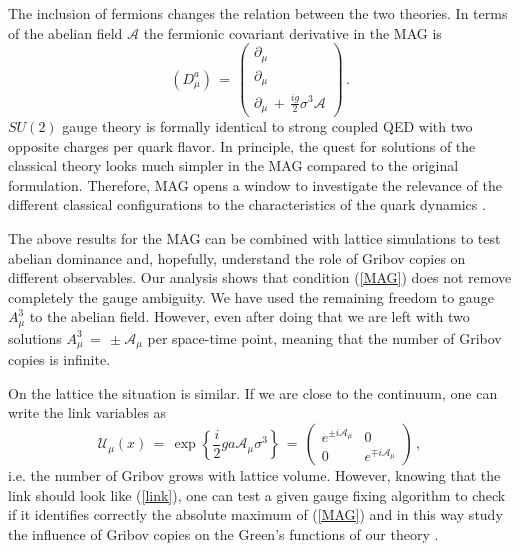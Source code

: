 \documentclass[a4paper,a4paper]{article}
\begin{document}
The inclusion of fermions changes the relation between the two theories. 
In terms of the abelian field $\mathcal{A}$ the fermionic 
covariant derivative in the MAG is
\begin{equation}
 \left( D^a_\mu \right) \, = \, 
   \left( \begin{array}{c}
                  \partial_\mu  \\
                  \partial_\mu  \\
                  \partial_\mu \, + \, \frac{ig}{2} \sigma^3 \mathcal{A}
          \end{array}
   \right) \, . 
  \label{dfermion}
\end{equation}
$SU(2)$ gauge theory is formally identical to strong coupled QED with two 
opposite charges per quark flavor. In principle, the quest for solutions of
the classical theory looks much simpler in the MAG compared to the original 
formulation. Therefore, MAG opens a window to investigate the relevance of
the different classical configurations to the characteristics of the quark 
dynamics \cite{OO}.

The above results for the MAG can be combined with lattice simulations
to test abelian dominance and, hopefully, understand the role of 
Gribov copies on different observables. Our analysis shows that 
condition (\ref{MAG}) does not remove completely the gauge ambiguity. 
We have used the remaining freedom to gauge $A^3_\mu$ to the abelian field. 
However, even after doing that we are left with two solutions 
$A^3_\mu \, = \, \pm \mathcal{A}_\mu$ per space-time point, meaning that the 
number of Gribov copies is infinite. 

On the lattice the situation is similar. If we are close to the continuum, 
one can write the link variables as
\begin{equation}
  \mathcal{U}_\mu (x) \, = \, \exp \left\{ \frac{i}{2} g a \mathcal{A}_\mu
                                           \sigma^3 \right\}
  \, = \,
  \left(  \begin{array}{cc}
          e^{ \pm i \mathcal{A}_\mu }  &  0  \\
           0    &    e^{ \mp i \mathcal{A}_\mu }
          \end{array}
  \right) \, ,
  \label{link}
\end{equation}
i.e. the number of Gribov grows with lattice volume.
However, knowing that the link should look like (\ref{link}), one can
test a given gauge fixing algorithm to check if it identifies
correctly the absolute maximum of (\ref{MAG}) and in this way
study the influence of Gribov copies on the Green's functions of our theory
\cite{Stack}.
\end{document}
